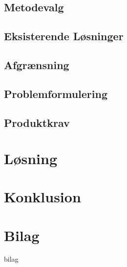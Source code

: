 \documentclass[12pt]{report}
\begin{document}
	\section{Metodevalg}
	

	\section{Eksisterende Løsninger}
	

	\section{Afgrænsning}
	

	\section{Problemformulering}
		
	
	\section{Produktkrav}
	
	



\chapter{Løsning}



\chapter{Konklusion}






\chapter*{Bilag}
 {bilag}
\end{document}
